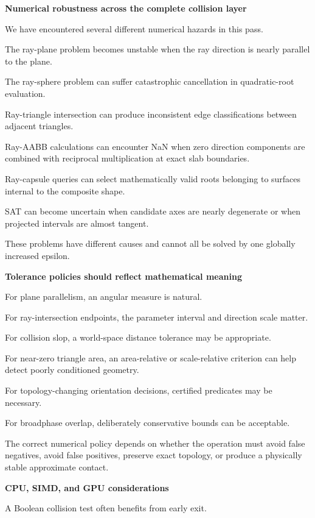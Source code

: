 \hypertarget{04-visual-computing-ii-ch025-part-x-numerical-robustness-performance-and-research}{}

\textbf{Numerical robustness across the complete collision layer}

We have encountered several different numerical hazards in this pass.

The ray-plane problem becomes unstable when the ray direction is nearly parallel to the plane.

The ray-sphere problem can suffer catastrophic cancellation in quadratic-root evaluation.

Ray-triangle intersection can produce inconsistent edge classifications between adjacent triangles.

Ray-AABB calculations can encounter NaN when zero direction components are combined with reciprocal multiplication at exact slab boundaries.

Ray-capsule queries can select mathematically valid roots belonging to surfaces internal to the composite shape.

SAT can become uncertain when candidate axes are nearly degenerate or when projected intervals are almost tangent.

These problems have different causes and cannot all be solved by one globally increased epsilon.

\textbf{Tolerance policies should reflect mathematical meaning}

For plane parallelism, an angular measure is natural.

For ray-intersection endpoints, the parameter interval and direction scale matter.

For collision slop, a world-space distance tolerance may be appropriate.

For near-zero triangle area, an area-relative or scale-relative criterion can help detect poorly conditioned geometry.

For topology-changing orientation decisions, certified predicates may be necessary.

For broadphase overlap, deliberately conservative bounds can be acceptable.

The correct numerical policy depends on whether the operation must avoid false negatives, avoid false positives, preserve exact topology, or produce a physically stable approximate contact.

\textbf{CPU, SIMD, and GPU considerations}

A Boolean collision test often benefits from early exit.

